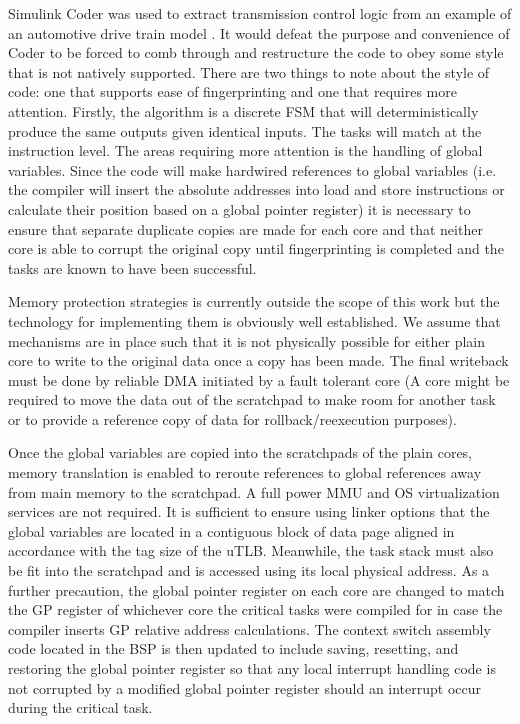 Simulink Coder was used to extract transmission control logic from an example of an automotive drive train model \cite{sim_trans}. It would defeat the purpose and convenience of Coder to be forced to comb through and restructure the code to obey some style that is not natively supported. There are two things to note about the style of code: one that supports ease of fingerprinting and one that requires more attention. Firstly, the algorithm is a discrete FSM that will deterministically produce the same outputs given identical inputs. The tasks will match at the instruction level. The areas requiring more attention is the handling of global variables. Since the code will make hardwired references to global variables (i.e. the compiler will insert the absolute addresses into load and store instructions or calculate their position based on a global pointer register) it is necessary to ensure that separate duplicate copies are made for each core and that neither core is able to corrupt the original copy until fingerprinting is completed and the tasks are known to have been successful. 

Memory protection strategies is currently outside the scope of this work but the technology for implementing them is obviously well established. We assume that mechanisms are in place such that it is not physically possible for either plain core to write to the original data once a copy has been made. The final writeback must be done by reliable DMA initiated by a fault tolerant core (A core might be required to move the data out of the scratchpad to make room for another task or to provide a reference copy of data for rollback/reexecution purposes).

Once the global variables are copied into the scratchpads of the plain cores, memory translation is enabled to reroute references to global references away from main memory to the scratchpad. A full power MMU and OS virtualization services are not required. It is sufficient to ensure using linker options that the global variables are located in a contiguous block of data page aligned in accordance with the tag size of the uTLB. Meanwhile, the task stack must also be fit into the scratchpad and is accessed using its local physical address. As a further precaution, the global pointer register on each core are changed to match the GP register of whichever core the critical tasks were compiled for in case the compiler inserts GP relative address calculations. The context switch assembly code located in the BSP is then updated to include saving, resetting, and restoring the global pointer register so that any local interrupt handling code is not corrupted by a modified global pointer register should an interrupt occur during the critical task.



